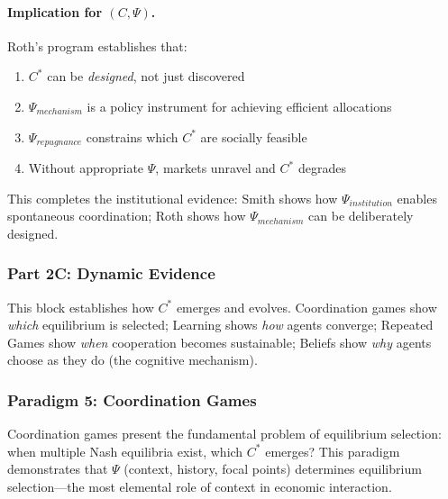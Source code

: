 \paragraph{Implication for $(C, \Psi)$.}
Roth's program establishes that:
\begin{enumerate}[nosep]
    \item $C^*$ can be \emph{designed}, not just discovered
    \item $\Psi_{mechanism}$ is a policy instrument for achieving efficient allocations
    \item $\Psi_{repugnance}$ constrains which $C^*$ are socially feasible
    \item Without appropriate $\Psi$, markets unravel and $C^*$ degrades
\end{enumerate}
This completes the institutional evidence: Smith shows how $\Psi_{institution}$
enables spontaneous coordination; Roth shows how $\Psi_{mechanism}$ can be
deliberately designed.


\subsubsection*{Part 2C: Dynamic Evidence}

This block establishes how $C^*$ emerges and evolves. Coordination games show
\emph{which} equilibrium is selected; Learning shows \emph{how} agents converge;
Repeated Games show \emph{when} cooperation becomes sustainable; Beliefs show
\emph{why} agents choose as they do (the cognitive mechanism).


\subsubsection{Paradigm 5: Coordination Games}

Coordination games present the fundamental problem of equilibrium selection:
when multiple Nash equilibria exist, which $C^*$ emerges? This paradigm demonstrates
that $\Psi$ (context, history, focal points) determines equilibrium selection---the
most elemental role of context in economic interaction.

